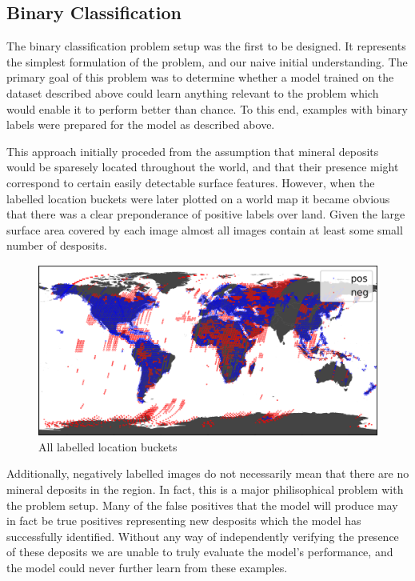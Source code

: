 \documentclass[10pt]{article}
\begin{document}
\subsection{Binary Classification}\label{sec:bin}

The binary classification problem setup was the first to be designed. It represents
the simplest formulation of the problem, and our naive initial understanding.
The primary goal of this problem was to determine whether a model trained
on the dataset described above could learn anything relevant to the problem which
would enable it to perform better than chance. To this end, examples with binary
labels were prepared for the model as described above. 

This approach initially proceded from the assumption that mineral deposits would
be sparesely located throughout the world, and that their presence might correspond
to certain easily detectable surface features. However, when the labelled location
buckets were later plotted on a world map it became obvious that there was
a clear preponderance of positive labels over land. Given the large surface area
covered by each image almost all images contain at least some small number of desposits. 

\begin{figure}[ht]
  \centering
  \includegraphics[width=0.75\linewidth]{locations.png}
  \caption{All labelled location buckets}
  \label{fig:locations}
\end{figure}

Additionally, negatively labelled images do not necessarily mean that there are
no mineral deposits in the region. In fact, this is a major philisophical problem
with the problem setup. Many of the false positives that the model will produce
may in fact be true positives representing new desposits which the model has
successfully identified. Without any way of independently verifying the 
presence of these deposits we are unable to truly evaluate the model's performance,
and the model could never further learn from these examples.
\end{document}
